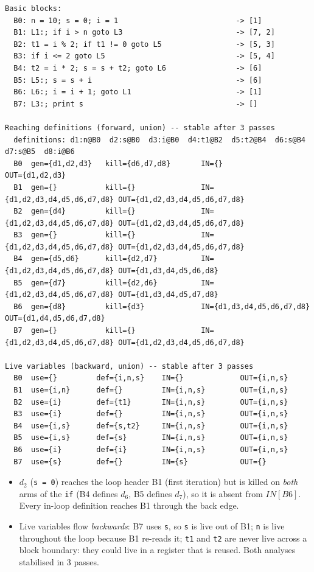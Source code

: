 \documentclass[10pt,a4paper,openany,oneside]{report}
\begin{document}
\begin{lstlisting}[style=out,title={Captured output}]
Basic blocks:
  B0: n = 10; s = 0; i = 1                           -> [1]
  B1: L1:; if i > n goto L3                          -> [7, 2]
  B2: t1 = i % 2; if t1 != 0 goto L5                 -> [5, 3]
  B3: if i <= 2 goto L5                              -> [5, 4]
  B4: t2 = i * 2; s = s + t2; goto L6                -> [6]
  B5: L5:; s = s + i                                 -> [6]
  B6: L6:; i = i + 1; goto L1                        -> [1]
  B7: L3:; print s                                   -> []

Reaching definitions (forward, union) -- stable after 3 passes
  definitions: d1:n@B0  d2:s@B0  d3:i@B0  d4:t1@B2  d5:t2@B4  d6:s@B4  d7:s@B5  d8:i@B6
  B0  gen={d1,d2,d3}   kill={d6,d7,d8}       IN={}                     OUT={d1,d2,d3}
  B1  gen={}           kill={}               IN={d1,d2,d3,d4,d5,d6,d7,d8} OUT={d1,d2,d3,d4,d5,d6,d7,d8}
  B2  gen={d4}         kill={}               IN={d1,d2,d3,d4,d5,d6,d7,d8} OUT={d1,d2,d3,d4,d5,d6,d7,d8}
  B3  gen={}           kill={}               IN={d1,d2,d3,d4,d5,d6,d7,d8} OUT={d1,d2,d3,d4,d5,d6,d7,d8}
  B4  gen={d5,d6}      kill={d2,d7}          IN={d1,d2,d3,d4,d5,d6,d7,d8} OUT={d1,d3,d4,d5,d6,d8}
  B5  gen={d7}         kill={d2,d6}          IN={d1,d2,d3,d4,d5,d6,d7,d8} OUT={d1,d3,d4,d5,d7,d8}
  B6  gen={d8}         kill={d3}             IN={d1,d3,d4,d5,d6,d7,d8} OUT={d1,d4,d5,d6,d7,d8}
  B7  gen={}           kill={}               IN={d1,d2,d3,d4,d5,d6,d7,d8} OUT={d1,d2,d3,d4,d5,d6,d7,d8}

Live variables (backward, union) -- stable after 3 passes
  B0  use={}         def={i,n,s}    IN={}             OUT={i,n,s}
  B1  use={i,n}      def={}         IN={i,n,s}        OUT={i,n,s}
  B2  use={i}        def={t1}       IN={i,n,s}        OUT={i,n,s}
  B3  use={i}        def={}         IN={i,n,s}        OUT={i,n,s}
  B4  use={i,s}      def={s,t2}     IN={i,n,s}        OUT={i,n,s}
  B5  use={i,s}      def={s}        IN={i,n,s}        OUT={i,n,s}
  B6  use={i}        def={i}        IN={i,n,s}        OUT={i,n,s}
  B7  use={s}        def={}         IN={s}            OUT={}
\end{lstlisting}
\begin{exbox}
\begin{itemize}[nosep]
\item $d_2$ (\texttt{s = 0}) reaches the loop header B1 (first iteration) but is killed on \emph{both} arms of the \texttt{if} (B4 defines $d_6$, B5 defines $d_7$), so it is absent from $IN[B6]$. Every in-loop definition reaches B1 through the back edge.
\item Live variables flow \emph{backwards}: B7 uses \texttt{s}, so \texttt{s} is live out of B1; \texttt{n} is live throughout the loop because B1 re-reads it; \texttt{t1} and \texttt{t2} are never live across a block boundary: they could live in a register that is reused. Both analyses stabilised in 3 passes.
\end{itemize}
\end{exbox}
\end{document}
